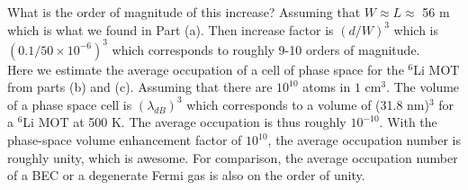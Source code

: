 \documentclass{article}
\theoremstyle{definition}
\begin{document}
\begin{enumerate}[label=(\alph*)]
\noindent What is the order of magnitude of this increase? Assuming that $W\approx L \approx $ 56 \textmu m which is what we found in Part (a). Then increase factor is $(d/W)^3$ which is $(0.1 / 50 \times 10^{-6})^3$ which corresponds to roughly 9-10 orders of magnitude. \\

\noindent Here we estimate the average occupation of a cell of phase space for the $^6$Li MOT from parts (b) and (c). Assuming that there are $10^{10}$ atoms in $1$ cm$^3$. The volume of a phase space cell is $(\lambda_{dB})^3$ which corresponds to a volume of (31.8 nm)$^3$ for a $^6$Li MOT at 500 \textmu K. The average occupation is thus roughly $10^{-10}$. With the phase-space volume enhancement factor of $10^{10}$, the average occupation number is roughly unity, which is awesome. For comparison, the average occupation number of a BEC or a degenerate Fermi gas is also on the order of unity. 

\end{enumerate}
\end{document}
